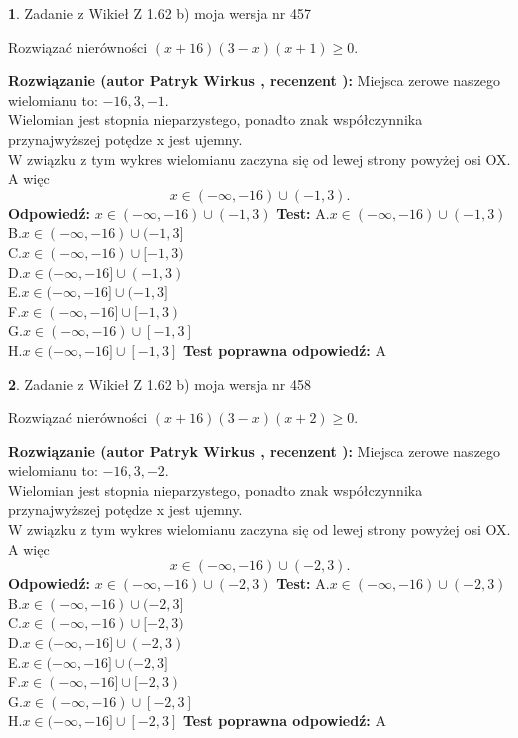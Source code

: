 \documentclass[12pt, a4paper]{article}
\theoremstyle{definition} %
\newtheorem{zad}{}
\newcommand{\zadStart}[1]{\begin{zad}#1\newline}
\newcommand{\zadStop}{\end{zad}}
\newcommand{\rozwStart}[2]{\noindent \textbf{Rozwiązanie (autor #1 , recenzent #2): }\newline}
\newcommand{\rozwStop}{\newline}
\newcommand{\odpStart}{\noindent \textbf{Odpowiedź:}\newline}
\newcommand{\odpStop}{\newline}
\newcommand{\testStart}{\noindent \textbf{Test:}\newline}
\newcommand{\testStop}{\newline}
\newcommand{\kluczStart}{\noindent \textbf{Test poprawna odpowiedź:}\newline}
\newcommand{\kluczStop}{\newline}
\begin{document}
\zadStart{Zadanie z Wikieł Z 1.62 b) moja wersja nr 457}

Rozwiązać nierówności $(x+16)(3-x)(x+1)\ge0$.
\zadStop
\rozwStart{Patryk Wirkus}{}
Miejsca zerowe naszego wielomianu to: $-16, 3, -1$.\\
Wielomian jest stopnia nieparzystego, ponadto znak współczynnika przy\linebreak najwyższej potędze x jest ujemny.\\ W związku z tym wykres wielomianu zaczyna się od lewej strony powyżej osi OX. A więc $$x \in (-\infty,-16) \cup (-1,3).$$
\rozwStop
\odpStart
$x \in (-\infty,-16) \cup (-1,3)$
\odpStop
\testStart
A.$x \in (-\infty,-16) \cup (-1,3)$\\
B.$x \in (-\infty,-16) \cup (-1,3]$\\
C.$x \in (-\infty,-16) \cup [-1,3)$\\
D.$x \in (-\infty,-16] \cup (-1,3)$\\
E.$x \in (-\infty,-16] \cup (-1,3]$\\
F.$x \in (-\infty,-16] \cup [-1,3)$\\
G.$x \in (-\infty,-16) \cup [-1,3]$\\
H.$x \in (-\infty,-16] \cup [-1,3]$
\testStop
\kluczStart
A
\kluczStop



\zadStart{Zadanie z Wikieł Z 1.62 b) moja wersja nr 458}

Rozwiązać nierówności $(x+16)(3-x)(x+2)\ge0$.
\zadStop
\rozwStart{Patryk Wirkus}{}
Miejsca zerowe naszego wielomianu to: $-16, 3, -2$.\\
Wielomian jest stopnia nieparzystego, ponadto znak współczynnika przy\linebreak najwyższej potędze x jest ujemny.\\ W związku z tym wykres wielomianu zaczyna się od lewej strony powyżej osi OX. A więc $$x \in (-\infty,-16) \cup (-2,3).$$
\rozwStop
\odpStart
$x \in (-\infty,-16) \cup (-2,3)$
\odpStop
\testStart
A.$x \in (-\infty,-16) \cup (-2,3)$\\
B.$x \in (-\infty,-16) \cup (-2,3]$\\
C.$x \in (-\infty,-16) \cup [-2,3)$\\
D.$x \in (-\infty,-16] \cup (-2,3)$\\
E.$x \in (-\infty,-16] \cup (-2,3]$\\
F.$x \in (-\infty,-16] \cup [-2,3)$\\
G.$x \in (-\infty,-16) \cup [-2,3]$\\
H.$x \in (-\infty,-16] \cup [-2,3]$
\testStop
\kluczStart
A
\kluczStop
\end{document}
